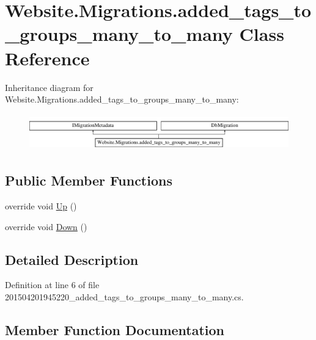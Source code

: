 \hypertarget{class_website_1_1_migrations_1_1added__tags__to__groups__many__to__many}{}\section{Website.\+Migrations.\+added\+\_\+tags\+\_\+to\+\_\+groups\+\_\+many\+\_\+to\+\_\+many Class Reference}
\label{class_website_1_1_migrations_1_1added__tags__to__groups__many__to__many}
Inheritance diagram for Website.\+Migrations.\+added\+\_\+tags\+\_\+to\+\_\+groups\+\_\+many\+\_\+to\+\_\+many\+:\begin{figure}[H]
\begin{center}
\leavevmode
\includegraphics[height=1.600000cm]{class_website_1_1_migrations_1_1added__tags__to__groups__many__to__many}
\end{center}
\end{figure}
\subsection*{Public Member Functions}
\begin{DoxyCompactItemize}
\item 
override void \hyperlink{class_website_1_1_migrations_1_1added__tags__to__groups__many__to__many_a6fd551e53083a2e59f18906462759157}{Up} ()
\item 
override void \hyperlink{class_website_1_1_migrations_1_1added__tags__to__groups__many__to__many_a98bdf5f86a4dbc0c687b37695714e8ea}{Down} ()
\end{DoxyCompactItemize}


\subsection{Detailed Description}


Definition at line 6 of file 201504201945220\+\_\+added\+\_\+tags\+\_\+to\+\_\+groups\+\_\+many\+\_\+to\+\_\+many.\+cs.



\subsection{Member Function Documentation}
\hypertarget{class_website_1_1_migrations_1_1added__tags__to__groups__many__to__many_a98bdf5f86a4dbc0c687b37695714e8ea}{}
